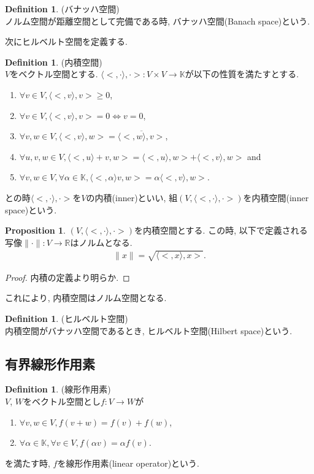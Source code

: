 \documentclass[11pt, a4paper, dvipdfmx]{jsarticle}
\theoremstyle{definition}
\newtheorem{Definition+}[Axiom+]{Definition}
\newtheorem{Proposition+}[Axiom+]{Proposition}
\newcommand{\R}{\mathbb{R}}
\newcommand{\lan}{\langle}
\newcommand{\ran}{\rangle}
\newcommand{\K}{\mathbb{K}}
\newcommand{\innersp}{(V, \inner<\cdot, \cdot>)}
\newcommand{\inner}[2]{\lan #1, #2\ran}
\begin{document}
\begin{Definition+}(バナッハ空間)\\
    ノルム空間が距離空間として完備である時, バナッハ空間(Banach space)という.
\end{Definition+}
次にヒルベルト空間を定義する.
\begin{Definition+}(内積空間)\\
    $V$をベクトル空間とする. $\inner<\cdot, \cdot>: V\times V\to\K$が以下の性質を満たすとする.
    \begin{enumerate}
        \item $\forall v\in V, \inner<v, v>\geq 0$,
        \item $\forall v\in V, \inner<v, v> = 0\iff v = 0$,
        \item $\forall v, w\in V, \inner<v, w> = \overline{\inner<w, v>}$,
        \item $\forall u, v, w\in V, \inner<u + v, w> = \inner<u, w> + \inner<v, w>$ and
        \item $\forall v, w\in V, \forall\alpha\in\K, \inner<\alpha v, w> = \alpha\inner<v, w>$.
    \end{enumerate}
    との時$\inner<\cdot, \cdot>$を$V$の内積(inner)といい, 組$(V, \inner<\cdot, \cdot>)$を内積空間(inner space)という.
\end{Definition+}
\begin{Proposition+}
    $\innersp$を内積空間とする. この時, 以下で定義される写像$\|\cdot\|:V\to\R$はノルムとなる.
    \begin{align*}
        \|x\| = \sqrt{\inner<x, x>}.
    \end{align*}
    \begin{proof}
        内積の定義より明らか.
    \end{proof}
\end{Proposition+}
これにより, 内積空間はノルム空間となる.
\begin{Definition+}(ヒルベルト空間)\\
    内積空間がバナッハ空間であるとき, ヒルベルト空間(Hilbert space)という.
\end{Definition+}
\subsection{有界線形作用素}
\begin{Definition+}(線形作用素)\\
    $V$, $W$をベクトル空間とし$f:V\to W$が
    \begin{enumerate}
        \item $\forall v, w\in V, f(v + w) = f(v) + f(w)$,
        \item $\forall\alpha\in\K, \forall v\in V, f(\alpha v) = \alpha f(v)$.
    \end{enumerate}
    を満たす時, $f$を線形作用素(linear operator)という.
\end{Definition+}
\end{document}
